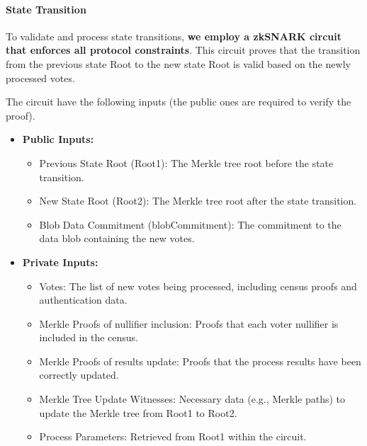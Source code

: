 \paragraph{State Transition}

To validate and process state transitions, \textbf{we employ a zkSNARK circuit that enforces all protocol constraints}. This circuit proves that the transition from the previous state Root to the new state Root is valid based on the newly processed votes.

\begin{figure}[H]
	\centering
\end{figure}

The circuit have the following inputs (the public ones are required to verify the proof).

\begin{itemize}
	\item \textbf{Public Inputs:}
	\begin{itemize}
		\item Previous State Root (Root1): The Merkle tree root before the state transition.
		\item New State Root (Root2): The Merkle tree root after the state transition.
		\item Blob Data Commitment (blobCommitment): The commitment to the data blob containing the new votes.
	\end{itemize}
	\item \textbf{Private Inputs:}	
	\begin{itemize}
		\item Votes: The list of new votes being processed, including census proofs and authentication data.
		\item Merkle Proofs of nullifier inclusion: Proofs that each voter nullifier is included in the census.
		\item Merkle Proofs of results update: Proofs that the process results have been correctly updated.
		\item Merkle Tree Update Witnesses: Necessary data (e.g., Merkle paths) to update the Merkle tree from Root1 to Root2.
		\item Process Parameters: Retrieved from Root1 within the circuit.
	\end{itemize}
\end{itemize}

\begin{figure}[H]
	\centering
\end{figure}

